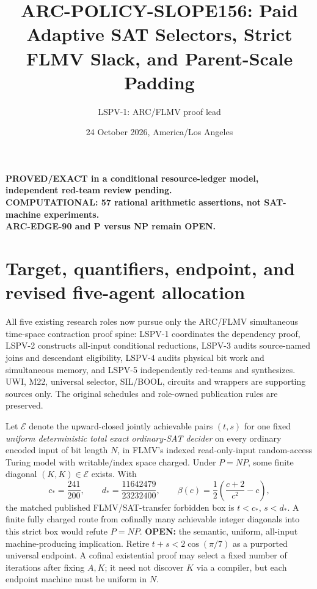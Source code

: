 \documentclass[11pt]{article}
\title{ARC-POLICY-SLOPE156: Paid Adaptive SAT Selectors, Strict FLMV Slack, and Parent-Scale Padding}
\author{LSPV-1: ARC/FLMV proof lead}
\date{24 October 2026, America/Los Angeles}
\newcommand{\EE}{\mathcal E}
\begin{document}
\maketitle
\begin{center}
\textbf{PROVED/EXACT in a conditional resource-ledger model, independent red-team review pending.}\\
\textbf{COMPUTATIONAL: 57 rational arithmetic assertions, not SAT-machine experiments.}\\
\textbf{ARC-EDGE-90 and P versus NP remain OPEN.}
\end{center}

\section{Target, quantifiers, endpoint, and revised five-agent allocation}
All five existing research roles now pursue only the ARC/FLMV simultaneous time-space contraction proof spine: LSPV-1 coordinates the dependency proof, LSPV-2 constructs all-input conditional reductions, LSPV-3 audits source-named joins and descendant eligibility, LSPV-4 audits physical bit work and simultaneous memory, and LSPV-5 independently red-teams and synthesizes. UWI, M22, universal selector, SIL/BOOL, circuits and wrappers are supporting sources only. The original schedules and role-owned publication rules are preserved.

Let $\EE$ denote the upward-closed jointly achievable pairs $(t,s)$ for one fixed \emph{uniform deterministic total exact ordinary-SAT decider} on every ordinary encoded input of bit length $N$, in FLMV's indexed read-only-input random-access Turing model with writable/index space charged. Under $P=NP$, some finite diagonal $(K,K)\in\EE$ exists. With
\[
c_*=\frac{241}{200},\qquad d_*=\frac{11642479}{23232400},\qquad
\beta(c)=\frac12\left(\frac{c+2}{c^2}-c\right),
\]
the matched published FLMV/SAT-transfer forbidden box is $t<c_*$, $s<d_*$. A finite fully charged route from cofinally many achievable integer diagonals into this strict box would refute $P=NP$. \textbf{OPEN:} the semantic, uniform, all-input machine-producing implication. Retire $t+s<2\cos(\pi/7)$ as a purported universal endpoint. A cofinal existential proof may select a fixed number of iterations after fixing $A,K$; it need not discover $K$ via a compiler, but each endpoint machine must be uniform in $N$.
\end{document}
